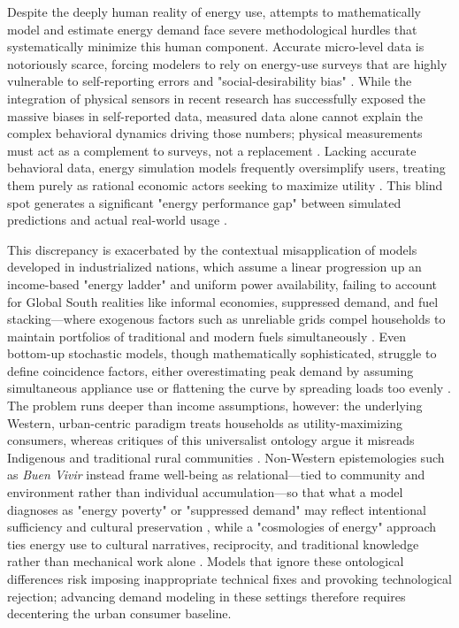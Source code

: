 \documentclass[final,3p,times,onecolumn]{elsarticle}
\begin{document}
Despite the deeply human reality of energy use, attempts to mathematically model and estimate energy demand face severe methodological hurdles that systematically minimize this human component. Accurate micro-level data is notoriously scarce, forcing modelers to rely on energy-use surveys that are highly vulnerable to self-reporting errors and "social-desirability bias" \cite{blodgett_accuracy_2017, m_heinrich_energy_2022}. While the integration of physical sensors in recent research has successfully exposed the massive biases in self-reported data, measured data alone cannot explain the complex behavioral dynamics driving those numbers; physical measurements must act as a complement to surveys, not a replacement \cite{rom_using_2020}. Lacking accurate behavioral data, energy simulation models frequently oversimplify users, treating them purely as rational economic actors seeking to maximize utility \cite{riva_long-term_2018}. This blind spot generates a significant "energy performance gap" between simulated predictions and actual real-world usage \cite{medojevic_integrated_2021}.

This discrepancy is exacerbated by the contextual misapplication of models developed in industrialized nations, which assume a linear progression up an income-based "energy ladder" and uniform power availability, failing to account for Global South realities like informal economies, suppressed demand, and fuel stacking—where exogenous factors such as unreliable grids compel households to maintain portfolios of traditional and modern fuels simultaneously \cite{stevanato_data-driven_2025, liu_impact_2022, Muhumuza2018}. Even bottom-up stochastic models, though mathematically sophisticated, struggle to define coincidence factors, either overestimating peak demand by assuming simultaneous appliance use or flattening the curve by spreading loads too evenly \cite{kuster_electrical_2017, herraiz-canete_forecasting_2022}. The problem runs deeper than income assumptions, however: the underlying Western, urban-centric paradigm treats households as utility-maximizing consumers, whereas critiques of this universalist ontology argue it misreads Indigenous and traditional rural communities \cite{shokrgozar_fine_2025}. Non-Western epistemologies such as \textit{Buen Vivir} instead frame well-being as relational—tied to community and environment rather than individual accumulation—so that what a model diagnoses as "energy poverty" or "suppressed demand" may reflect intentional sufficiency and cultural preservation \cite{gudynas_buen_2011}, while a "cosmologies of energy" approach ties energy use to cultural narratives, reciprocity, and traditional knowledge rather than mechanical work alone \cite{mazzone_indigenous_2022}. Models that ignore these ontological differences risk imposing inappropriate technical fixes and provoking technological rejection; advancing demand modeling in these settings therefore requires decentering the urban consumer baseline.
\end{document}
